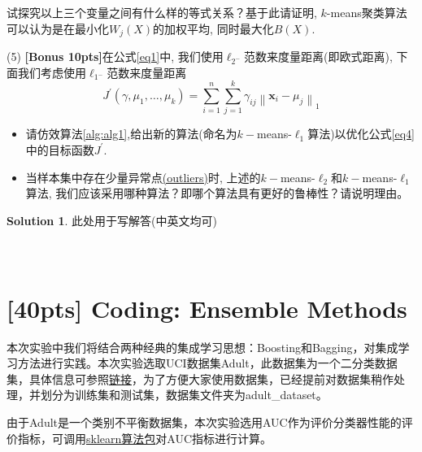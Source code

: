 \documentclass[a4paper,UTF8]{article}
\theoremstyle{definition}
\newtheorem*{solution}{Solution}
\begin{document}
试探究以上三个变量之间有什么样的等式关系？基于此请证明, $k$-means聚类算法可以认为是在最小化$W_j(X)$的加权平均, 同时最大化$B(X)$.


(5) \textbf{[Bonus 10pts]}在公式\ref{eq1}中, 我们使用$\ell_{2^{-}}$范数来度量距离(即欧式距离), 下面我们考虑使用$\ell_{1^{-}}$范数来度量距离
\begin{equation}
\label{eq4}
J^{\prime}\left(\gamma, \mu_{1}, \ldots, \mu_{k}\right)=\sum_{i=1}^{n} \sum_{j=1}^{k} \gamma_{i j}\left\|\mathbf{x}_{i}-\mu_{j}\right\|_{1}
\end{equation}
\begin{itemize}
	\item 请仿效算法\ref{alg:alg1},给出新的算法(命名为$k-$means-$\ell_{1}$算法)以优化公式\ref{eq4}中的目标函数$J^{\prime}$. 
	\item 当样本集中存在少量异常点\href{https://en.wikipedia.org/wiki/Outlier}{(outliers)}时, 上述的$k-$means-$\ell_{2}$和$k-$means-$\ell_{1}$算法,	我们应该采用哪种算法？即哪个算法具有更好的鲁棒性？请说明理由。
\end{itemize}


\begin{solution}
	此处用于写解答(中英文均可)
	~\\
	~\\
	~\\
\end{solution}


\section{[40pts] Coding: Ensemble Methods }

本次实验中我们将结合两种经典的集成学习思想：Boosting和Bagging，对集成学习方法进行实践。本次实验选取UCI数据集Adult，此数据集为一个二分类数据集，具体信息可参照\href{http://archive.ics.uci.edu/ml/datasets/Adult}{链接}，为了方便大家使用数据集，已经提前对数据集稍作处理，并划分为训练集和测试集，数据集文件夹为adult\_dataset。

由于Adult是一个类别不平衡数据集，本次实验选用AUC作为评价分类器性能的评价指标，可调用\href{http://scikit-learn.org/stable/modules/generated/sklearn.metrics.roc_auc_score.html}{sklearn算法包}对AUC指标进行计算。
\end{document}
